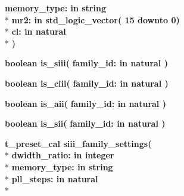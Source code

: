 \begin{DoxyCompactItemize}
{\bfseries \textcolor{vhdlchar}{memory\+\_\+type\+: }\textcolor{stringliteral}{in }{\bfseries \textcolor{comment}{string}\textcolor{vhdlchar}{ }}}\\*
{\bfseries \textcolor{vhdlchar}{mr2\+: }\textcolor{stringliteral}{in }\textcolor{vhdlchar}{std\+\_\+logic\+\_\+vector( 15 downto  0)}}\\*
{\bfseries \textcolor{vhdlchar}{cl\+: }\textcolor{stringliteral}{in }{\bfseries \textcolor{comment}{natural}\textcolor{vhdlchar}{ }}}\\*
{\bfseries  )} 
\item 
{\bfseries {\bfseries \textcolor{comment}{boolean}\textcolor{vhdlchar}{ }}} {\bf is\+\_\+siii}{\bfseries  ( }{\bfseries \textcolor{vhdlchar}{family\+\_\+id\+: }\textcolor{stringliteral}{in }{\bfseries \textcolor{comment}{natural}\textcolor{vhdlchar}{ }}}{\bfseries  )} 
\item 
{\bfseries {\bfseries \textcolor{comment}{boolean}\textcolor{vhdlchar}{ }}} {\bf is\+\_\+ciii}{\bfseries  ( }{\bfseries \textcolor{vhdlchar}{family\+\_\+id\+: }\textcolor{stringliteral}{in }{\bfseries \textcolor{comment}{natural}\textcolor{vhdlchar}{ }}}{\bfseries  )} 
\item 
{\bfseries {\bfseries \textcolor{comment}{boolean}\textcolor{vhdlchar}{ }}} {\bf is\+\_\+aii}{\bfseries  ( }{\bfseries \textcolor{vhdlchar}{family\+\_\+id\+: }\textcolor{stringliteral}{in }{\bfseries \textcolor{comment}{natural}\textcolor{vhdlchar}{ }}}{\bfseries  )} 
\item 
{\bfseries {\bfseries \textcolor{comment}{boolean}\textcolor{vhdlchar}{ }}} {\bf is\+\_\+sii}{\bfseries  ( }{\bfseries \textcolor{vhdlchar}{family\+\_\+id\+: }\textcolor{stringliteral}{in }{\bfseries \textcolor{comment}{natural}\textcolor{vhdlchar}{ }}}{\bfseries  )} 
\item 
{\bfseries {\bfseries \textcolor{vhdlchar}{t\+\_\+preset\+\_\+cal}\textcolor{vhdlchar}{ }}} {\bf siii\+\_\+family\+\_\+settings}{\bfseries  ( }\\*
{\bfseries \textcolor{vhdlchar}{dwidth\+\_\+ratio\+: }\textcolor{stringliteral}{in }{\bfseries \textcolor{comment}{integer}\textcolor{vhdlchar}{ }}}\\*
{\bfseries \textcolor{vhdlchar}{memory\+\_\+type\+: }\textcolor{stringliteral}{in }{\bfseries \textcolor{comment}{string}\textcolor{vhdlchar}{ }}}\\*
{\bfseries \textcolor{vhdlchar}{pll\+\_\+steps\+: }\textcolor{stringliteral}{in }{\bfseries \textcolor{comment}{natural}\textcolor{vhdlchar}{ }}}\\*

\end{DoxyCompactItemize}
